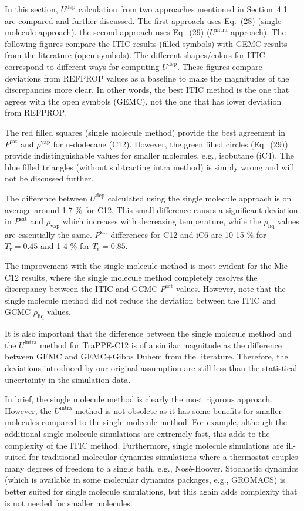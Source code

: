 \documentclass[%
 aip,
 jcp,
 sd,%
 amsmath,amssymb,
]{revtex4-1}
\begin{document}
In this section, $U^\mathrm{dep}$ calculation from two approaches mentioned in Section~4.1 are compared and further discussed. The first approach uses Eq.~(28) (single molecule approach). the second approach uses Eq.~(29) ($U^\mathrm{intra}$ approach). The following figures compare the ITIC results (filled symbols) with GEMC results from the literature (open symbols). The different shapes/colors for ITIC correspond to different ways for computing $U^\mathrm{dep}$. These figures compare deviations from REFPROP values as a baseline to make the magnitudes of the discrepancies more clear. In other words, the best ITIC method is the one that agrees with the open symbols (GEMC), not the one that has lower deviation from REFPROP.

The red filled squares (single molecule method) provide the best agreement in $P^\mathrm{sat}$ and $\rho^\mathrm{vap}$ for n-dodecane (C12). However, the green filled circles (Eq.~(29)) provide indistinguishable values for smaller molecules, e.g., isobutane (iC4). The blue filled triangles (without subtracting intra method) is simply wrong and will not be discussed further.

The difference between $U^\mathrm{dep}$ calculated using the single molecule approach is on average around 1.7 \% for C12. This small difference causes a significant deviation in $P^\mathrm{sat}$ and $\rho_\mathrm{vap}$ which increases with decreasing temperature, while the $\rho_\mathrm{liq}$ values are essentially the same. $P^\mathrm{sat}$ differences for C12 and iC6 are 10-15 \% for $T_\mathrm{r}=0.45$ and 1-4 \% for $T_\mathrm{r}=0.85$. 

The improvement with the single molecule method is most evident for the Mie-C12 results, where the single molecule method completely resolves the discrepancy between the ITIC and GCMC $P^\mathrm{sat}$ values. However, note that the single molecule method did not reduce the deviation between the ITIC and GCMC $\rho_\mathrm{liq}$ values. 

It is also important that the difference between the single molecule method and the $U^\mathrm{intra}$ method for TraPPE-C12 is of a similar magnitude as the difference between GEMC and GEMC+Gibbs Duhem from the literature. Therefore, the deviations introduced by our original assumption are still less than the statistical uncertainty in the simulation data.

In brief, the single molecule method is clearly the most rigorous approach. However, the $U^\mathrm{intra}$ method is not obsolete as it has some benefits for smaller molecules compared to the single molecule method. For example, although the additional single molecule simulations are extremely fast, this adds to the complexity of the ITIC method. Furthermore, single molecule simulations are ill-suited for traditional molecular dynamics simulations where a thermostat couples many degrees of freedom to a single bath, e.g., Nosé-Hoover. Stochastic dynamics (which is available in some molecular dynamics packages, e.g., GROMACS) is better suited for single molecule simulations, but this again adds complexity that is not needed for smaller molecules. 
 
\end{document}
